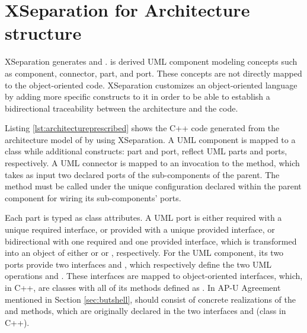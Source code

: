 \section{XSeparation for Architecture structure}
\label{sec:xseparationarchitecture}
XSeparation generates  and .
 is derived UML component modeling concepts such as component, connector, part, and port.
These concepts are not directly mapped to the object-oriented code.
XSeparation customizes an object-oriented language by adding more specific constructs to it in order to be able to establish a bidirectional traceability between the architecture and the code.

\begin{minipage}{\columnwidth}
	
\end{minipage}

Listing \ref{lst:architectureprescribed} shows the C++ code generated from the architecture model of  by using XSeparation.
A UML component is mapped to a class while additional constructs: part and port, reflect UML parts and ports, respectively.
A UML connector is mapped to an invocation to the  method, which takes as input two declared ports of the sub-components of the parent.
The  method must be called under the unique configuration declared within the parent component for wiring its sub-components' ports.







Each part is typed as class attributes.
A UML port is either required with a unique required interface, or provided with a unique provided interface, or bidirectional with one required and one provided interface, which is transformed into an object of either  or  or , respectively.
For the UML  component, its two ports provide two interfaces  and , which respectively define the two UML operations  and .
These interfaces are mapped to object-oriented interfaces, which, in C++, are classes with all of its methods defined as .
In AP-U Agreement mentioned in Section \ref{sec:butshell},  should consist of concrete realizations of the  and  methods, which are originally declared in the two interfaces  and  (class in C++).

